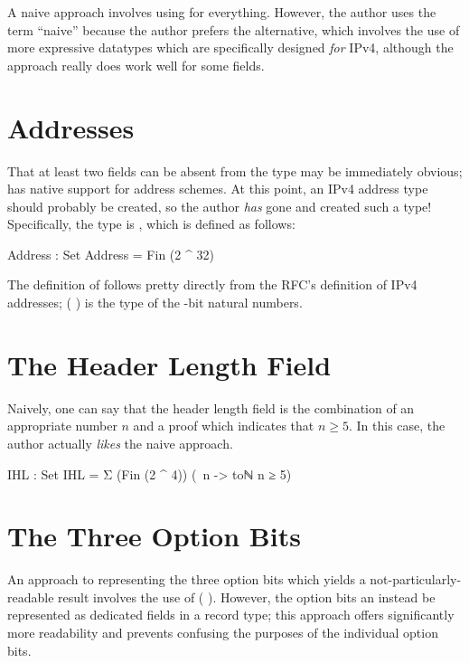 \documentclass{report}
\begin{document}
A naive approach involves using  for everything.  However, the author uses the term ``naive'' because the author prefers the alternative, which involves the use of more expressive datatypes which are specifically designed \emph{for} IPv4, although the  approach really does work well for some fields.

\section{Addresses}
That at least two fields can be absent from the  type may be immediately obvious;  has native support for address schemes.  At this point, an IPv4 address type should probably be created, so the author \emph{has} gone and created such a type!  Specifically, the type is , which is defined as follows:

\begin{code}
  Address : Set
  Address = Fin (2 ^ 32)
\end{code}

The definition of  follows pretty directly from the RFC's definition of IPv4 addresses;  \AgdaSymbol( \AgdaOperator{\AgdaFunction{^}} \AgdaSymbol) is the type of the -bit natural numbers.

\section{The Header Length Field}
Naively, one can say that the header length field is the combination of an appropriate  number \(n\) and a proof which indicates that \(n \geq 5\).  In this case, the author actually \emph{likes} the naive approach.

\begin{code}
  IHL : Set
  IHL = Σ (Fin (2 ^ 4)) (\ n -> toℕ n ≥ 5)
\end{code}

\section{The Three Option Bits}
An approach to representing the three option bits which yields a not-particularly-readable result involves the use of  \AgdaSymbol( \AgdaOperator{\AgdaFunction{\circumflex}} \AgdaSymbol).  However, the option bits an instead be represented as dedicated  fields in a record type; this approach offers significantly more readability and prevents confusing the purposes of the individual option bits.
\end{document}
